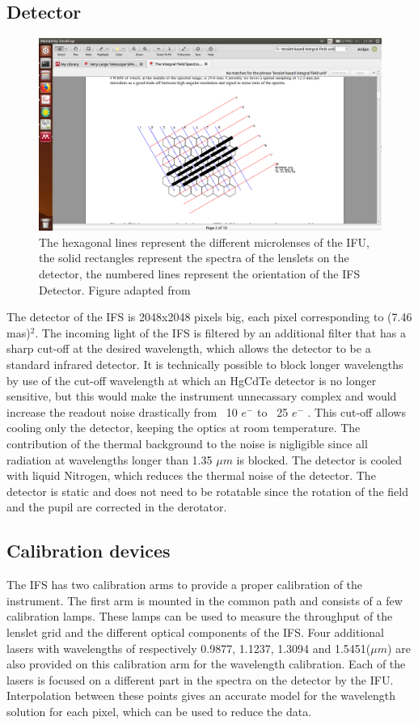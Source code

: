 \documentclass[twoside,single,12pt]{lion-msc}
\begin{document}
\subsection{Detector}
\begin{figure}[!b]
\centering 
\vspace{-0.5cm}
\includegraphics[trim={13cm 1.7cm 10cm 8cm},clip,width = 0.65\linewidth]{bigregrid}
\caption{The hexagonal lines represent the different microlenses of the IFU, the solid rectangles represent the spectra of the lenslets on the detector, the numbered lines  represent the orientation of the IFS Detector. Figure adapted from \cite{Claudi2006}} 
\label{fig:bigregrid}
\vspace{-0.5cm}
\end{figure}

The detector of the IFS is 2048x2048 pixels big, each pixel corresponding to (7.46 mas)$^2$. The incoming light of the IFS is filtered by an additional filter that has a sharp cut-off at the desired wavelength, which allows the detector to be a standard infrared detector. It is technically possible to block longer wavelengths by use of the cut-off wavelength at which an HgCdTe detector is no longer sensitive, but this would make the instrument unnecassary complex and would increase the readout noise drastically from ~10 $e^-$ to ~25 $e^-$ \citep{Claudi2006}. This cut-off allows cooling only the detector, keeping the optics at room temperature. The contribution of the thermal background to the noise is nigligible since all radiation at wavelengths longer than 1.35 $\mu m$ is blocked. The detector is cooled with liquid Nitrogen, which reduces the thermal noise of the detector\citep{Claudi2006}. The detector is static and does not need to be rotatable since the rotation of the field and the pupil are corrected in the derotator. 

\subsection{Calibration devices}
The IFS has two calibration arms to provide a proper calibration of the instrument. The first arm is mounted in the common path and consists of a few calibration lamps. These lamps can be used to measure the throughput of the lenslet grid and the different optical components of the IFS. Four additional lasers with wavelengths of respectively 0.9877, 1.1237, 1.3094 and 1.5451($\mu m$) are also provided on this calibration arm for the wavelength calibration. Each of the lasers is focused on a different part in the spectra on the detector by the IFU. Interpolation between these points gives an accurate model for the wavelength solution for each pixel, which can be used to reduce the data.
\bigskip
\end{document}
